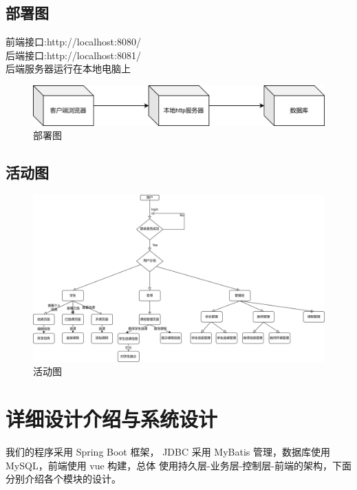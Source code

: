 \documentclass[12pt, a4paper]{article}
\begin{document}
\subsection{部署图}
前端接口:http://localhost:8080/\\
后端接口:http://localhost:8081/\\
后端服务器运行在本地电脑上\\
\begin{figure}[H]
  \centering
  \includegraphics[width = 0.8 \textwidth]{deployment.png}
  \caption{部署图}
\end{figure}

\subsection{活动图}
\begin{figure}[H]
  \centering
  \includegraphics[width = 0.8 \textwidth]{activity.png}
  \caption{活动图}
\end{figure}

\section{详细设计介绍与系统设计}
我们的程序采用 Spring Boot 框架， JDBC 采用 MyBatis 管理，数据库使用 MySQL，前端使用 vue 构建，总体
使用持久层-业务层-控制层-前端的架构，下面分别介绍各个模块的设计。
\end{document}
